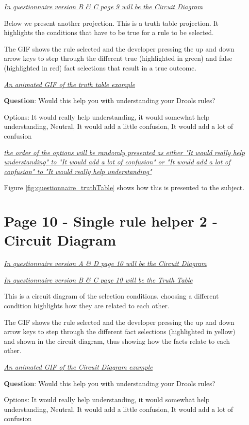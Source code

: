 \emph{\underline{In questionnaire version B \& C page 9 will be the Circuit Diagram}}

Below we present another projection.
This is a truth table projection.
It highlights the conditions that have to be true for a rule to be selected.

The GIF shows the rule selected and the developer pressing the up and down arrow keys to step through the different true (highlighted in green)  and false (highlighted in red) fact selections that result in a true outcome.

\emph{\underline{An animated GIF of the truth table example}}

\textbf{Question}: Would this help you with understanding your Drools rules?

Options: It would really help understanding, it would somewhat help understanding, Neutral, It would add a little confusion, It would add a lot of confusion

\emph{\underline{the order of the options will be randomly presented as either "It would really help understanding" to "It would add a lot of confusion" or "It would add a lot of confusion" to "It would really help understanding"}}

Figure \ref{fig:questionnaire_truthTable} shows how this is presented to the subject.

\section{Page 10 - Single rule helper 2 - Circuit Diagram}
\emph{\underline{In questionnaire version A \& D page 10 will be the Circuit Diagram}}

\emph{\underline{In questionnaire version B \& C page 10 will be the Truth Table}}

This is a circuit diagram of the selection conditions.
choosing a different condition highlights how they are related to each other.

The GIF shows the rule selected and the developer pressing the up and down arrow keys to step through the different fact selections (highlighted in yellow) and shown in the circuit diagram, thus showing how the facts relate to each other.

\emph{\underline{An animated GIF of the Circuit Diagram example}}

\textbf{Question}: Would this help you with understanding your Drools rules?

Options: It would really help understanding, it would somewhat help understanding, Neutral, It would add a little confusion, It would add a lot of confusion

